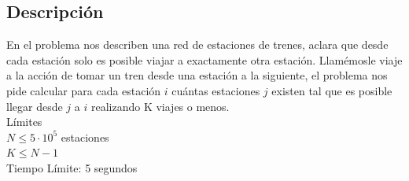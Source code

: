 \documentclass{report}
\begin{document}
\subsection{Descripci\'on}
En el problema nos describen una red de estaciones de trenes, aclara que desde cada estaci\'on solo es posible viajar a exactamente otra estaci\'on. Llam\'emosle viaje a la acci\'on de tomar un tren desde una estaci\'on a la siguiente, el problema nos pide calcular para cada estaci\'on $i$ cu\'antas estaciones $j$ existen tal que es posible llegar desde $j$ a $i$ realizando K viajes o menos.\\
L\'imites\\
$N \leq 5\cdot10^5$ estaciones\\
$K \leq N-1$\\
Tiempo L\'imite: 5 segundos\\
\end{document}
